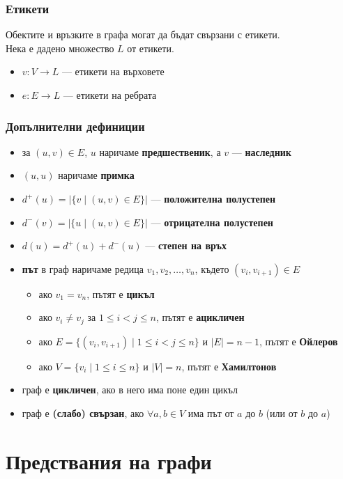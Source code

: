 \documentclass{beamer}
\begin{document}
\begin{frame}
  \frametitle{Етикети}
  Обектите и връзките в графа могат да бъдат свързани с етикети.\\[1em]
  \pause
  Нека е дадено множество $L$ от етикети.
  \begin{itemize}
  \item $v : V \rightarrow L$ --- етикети на върховете
  \item $e : E \rightarrow L$ --- етикети на ребрата
  \end{itemize}
\end{frame}

\begin{frame}
  \frametitle{Допълнителни дефиниции}
  \begin{itemize}[<+->]
  \item за $(u, v)\in E$, $u$ наричаме \textbf{предшественик}, а $v$ --- \textbf{наследник}
  \item $(u, u)$ наричаме \textbf{примка}
  \item $d^+(u) = |\{ v\;|\;(u, v) \in E\}|$ --- \textbf{положителна полустепен}
  \item $d^-(v) = |\{ u\;|\;(u, v) \in E\}|$ --- \textbf{отрицателна полустепен}
  \item $d(u) = d^+(u) + d^-(u)$ --- \textbf{степен на връх}
  \item \textbf{път} в граф наричаме редица $v_1, v_2, \ldots, v_n$, където $(v_i, v_{i+1}) \in E$
    \begin{itemize}
    \item ако $v_1 = v_n$, пътят е \textbf{цикъл}
    \item ако $v_i \neq v_j$ за $1 \leq i < j \leq n$, пътят е \textbf{ацикличен}
    \item ако $E = \{(v_i,v_{i+1})\;|\;1 \leq i < j \leq n\}$ и $|E| = n - 1$, пътят е \textbf{Ойлеров}
    \item ако $V = \{v_i\;|\;1 \leq i \leq n\}$ и $|V| = n$, пътят е \textbf{Хамилтонов}
    \end{itemize}
  \item граф е \textbf{цикличен}, ако в него има поне един цикъл
  \item граф е \textbf{(слабо) свързан}, ако $\forall a, b\in V$ има път от $a$ до $b$ (или от $b$ до $a$)
  \end{itemize}
\end{frame}

\section{Предствания на графи}
\end{document}
